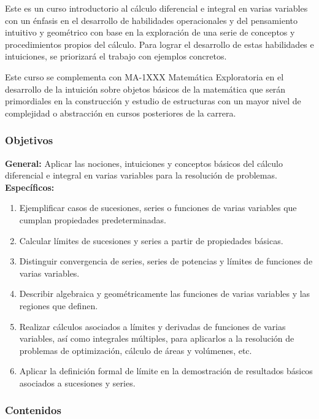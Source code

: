 \begin{refsection}
Este es un curso introductorio al cálculo diferencial e integral en varias variables con un énfasis en el desarrollo de habilidades operacionales y del pensamiento intuitivo y geométrico con base en la exploración de una serie de conceptos y procedimientos propios del cálculo. Para lograr el desarrollo de estas habilidades e intuiciones, se priorizará el trabajo con ejemplos concretos.

Este curso se complementa con MA-1XXX Matemática Exploratoria en el desarrollo de la intuición sobre objetos básicos de la matemática que serán primordiales en la construcción y estudio de estructuras con un mayor nivel de complejidad o abstracción en cursos posteriores de la carrera.



\subsubsection*{Objetivos}

\textbf{General:} Aplicar las nociones, intuiciones y conceptos básicos del cálculo diferencial e integral en varias variables para la resolución de problemas. \\

\textbf{Específicos:}

\begin{enumerate}
\item Ejemplificar casos de sucesiones, series o funciones de varias variables que cumplan propiedades predeterminadas.
\item Calcular límites de sucesiones y series a partir de propiedades básicas.
\item Distinguir convergencia de series, series de potencias y límites de funciones de varias variables.
\item Describir algebraica y geométricamente las funciones de varias variables y las regiones que definen.
\item Realizar cálculos asociados a límites y derivadas de funciones de varias variables, así como integrales múltiples, para aplicarlos a la resolución de problemas de optimización, cálculo de áreas y volúmenes, etc.
\item Aplicar la definición formal de límite en la demostración de resultados básicos asociados a sucesiones y series. \cite{axler2011algebra}
\end{enumerate} 

\subsubsection*{Contenidos}


\end{refsection}

